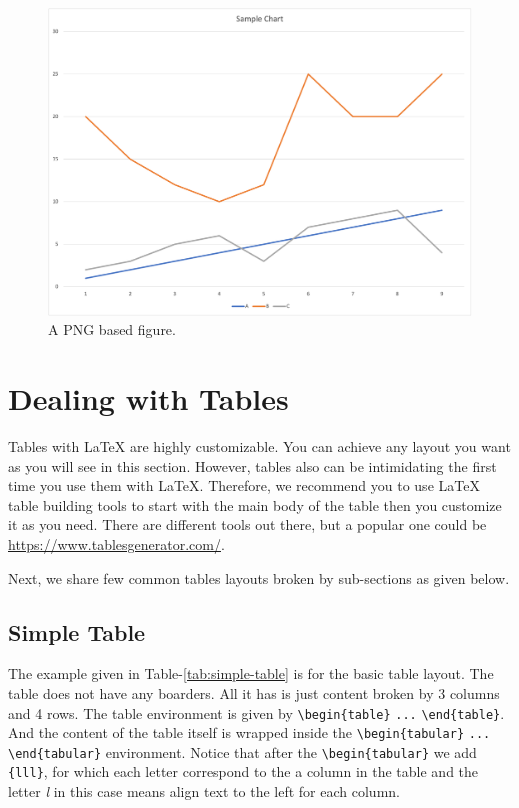 \begin{figure}[H]
    \begin{center}
        \includegraphics[width=0.5\linewidth]{figures/samples/png-sample.png}
        \caption{A PNG based figure.}
        \label{ref:png-based}
    \end{center}
\end{figure}



\section{Dealing with Tables}
\label{sec:dealing_with_tables}

Tables with {\LaTeX} are highly customizable. You can achieve any layout you want as you will see in this section. However, tables also can be intimidating the first time you use them with {\LaTeX}. Therefore, we recommend you to use {\LaTeX} table building tools to start with the main body of the table then you customize it as you need. There are different tools out there, but a popular one could be \href{https://www.tablesgenerator.com/}{https://www.tablesgenerator.com/}.

Next, we share few common tables layouts broken by sub-sections as given below.

\subsection{Simple Table}

The example given in Table-\ref{tab:simple-table} is for the basic table layout. The table does not have any boarders. All it has is just content broken by 3 columns and 4 rows. The table environment is given by \verb|\begin{table}| \verb|...| \verb|\end{table}|. And the content of the table itself is wrapped inside the \verb|\begin{tabular}| \verb|...| \verb|\end{tabular}| environment. Notice that after the \verb|\begin{tabular}| we add \verb|{lll}|, for which each letter correspond to the a column in the table and the letter \emph{l} in this case means align text to the left for each column.


